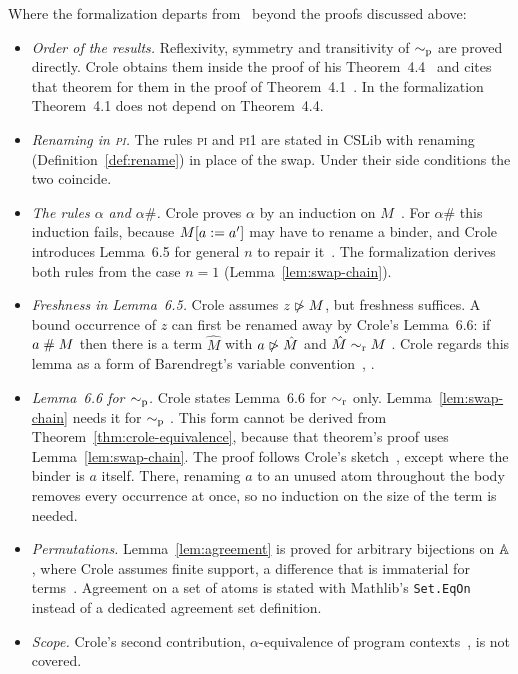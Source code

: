 Where the formalization departs from~\cite{crole2012a} beyond the
proofs discussed above:
\begin{itemize}
  \item \emph{Order of the results.} Reflexivity, symmetry and
    transitivity of $\sim_{\mathrm{p}}$ are proved directly. Crole obtains them
    inside the proof of his
    Theorem~4.4~\cite[p.~6]{crole2012a} and cites that theorem for
    them in the proof of Theorem~4.1~\cite[p.~5]{crole2012a}. In the
    formalization Theorem~4.1 does not depend on Theorem~4.4.
  \item \emph{Renaming in \textsc{pi}.} The rules \textsc{pi} and
    \textsc{pi1} are stated in CSLib with renaming
    (Definition~\ref{def:rename}) in place of the swap. Under their
    side conditions the two coincide.
  \item \emph{The rules $\alpha$ and $\alpha\#$.} Crole proves
    $\alpha$ by an induction on $M$~\cite[pp.~6--7]{crole2012a}. For
    $\alpha\#$ this induction fails, because $M[a \mathrel{{:}{=}} a']$ may
    have to rename a binder, and Crole introduces Lemma~6.5 for
    general $n$ to repair it~\cite[p.~8]{crole2012a}. The formalization derives both rules
    from the case $n = 1$ (Lemma~\ref{lem:swap-chain}).
  \item \emph{Freshness in Lemma~6.5.} Crole assumes $z \mathrel{\ntriangleright} M$, but
    freshness suffices. A bound occurrence of $z$ can first be
    renamed away by Crole's Lemma~6.6: if $a \mathrel{\#} M$ then
    there is a term $\hat{M}$ with $a \mathrel{\ntriangleright} \hat{M}$ and
    $\hat{M} \sim_{\mathrm{r}} M$
    .
    Crole regards this lemma as a form of Barendregt's variable
    convention~\cite[Convention~2.1.13]{barendregt1985a}, \cite[p.~8]{crole2012a}.
  \item \emph{Lemma~6.6 for $\sim_{\mathrm{p}}$.} Crole states Lemma~6.6 for
    $\sim_{\mathrm{r}}$ only. Lemma~\ref{lem:swap-chain} needs it for $\sim_{\mathrm{p}}$
    .
    This form cannot be derived from
    Theorem~\ref{thm:crole-equivalence}, because that theorem's proof
    uses Lemma~\ref{lem:swap-chain}. The proof follows Crole's
    sketch~\cite[p.~16]{crole2012a}, except where the binder is $a$
    itself. There, renaming $a$ to an unused atom throughout the body
    removes every occurrence at once, so no induction on the size of
    the term is needed.
  \item \emph{Permutations.} Lemma~\ref{lem:agreement} is proved for
    arbitrary bijections on $\mathbb{A}$, where Crole assumes finite
    support, a difference that is immaterial for
    terms~\cite[Remark~2.25]{gabbay2011a}. Agreement on a set of atoms is
    stated with Mathlib's \texttt{Set.EqOn}
    instead of a dedicated agreement set definition.
  \item \emph{Scope.} Crole's second contribution, $\alpha$-equivalence of
    program contexts~\cite[Section~5]{crole2012a}, is not covered.
\end{itemize}

